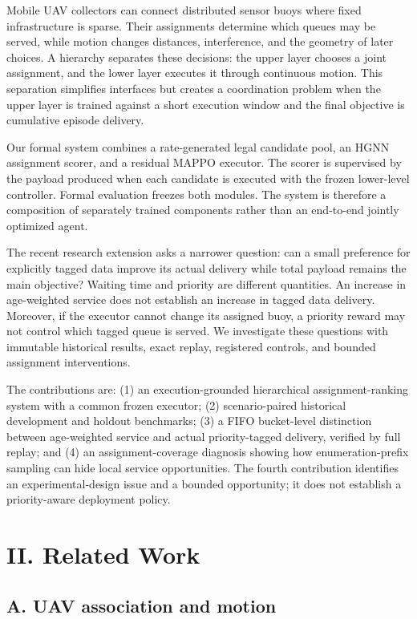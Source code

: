 Mobile UAV collectors can connect distributed sensor buoys where fixed infrastructure is sparse. Their assignments determine which queues may be served, while motion changes distances, interference, and the geometry of later choices. A hierarchy separates these decisions: the upper layer chooses a joint assignment, and the lower layer executes it through continuous motion. This separation simplifies interfaces but creates a coordination problem when the upper layer is trained against a short execution window and the final objective is cumulative episode delivery.

Our formal system combines a rate-generated legal candidate pool, an HGNN assignment scorer, and a residual MAPPO executor. The scorer is supervised by the payload produced when each candidate is executed with the frozen lower-level controller. Formal evaluation freezes both modules. The system is therefore a composition of separately trained components rather than an end-to-end jointly optimized agent.

The recent research extension asks a narrower question: can a small preference for explicitly tagged data improve its actual delivery while total payload remains the main objective? Waiting time and priority are different quantities. An increase in age-weighted service does not establish an increase in tagged data delivery. Moreover, if the executor cannot change its assigned buoy, a priority reward may not control which tagged queue is served. We investigate these questions with immutable historical results, exact replay, registered controls, and bounded assignment interventions.

The contributions are: (1) an execution-grounded hierarchical assignment-ranking system with a common frozen executor; (2) scenario-paired historical development and holdout benchmarks; (3) a FIFO bucket-level distinction between age-weighted service and actual priority-tagged delivery, verified by full replay; and (4) an assignment-coverage diagnosis showing how enumeration-prefix sampling can hide local service opportunities. The fourth contribution identifies an experimental-design issue and a bounded opportunity; it does not establish a priority-aware deployment policy.

\section*{II. Related Work}

\subsection*{A. UAV association and motion}

